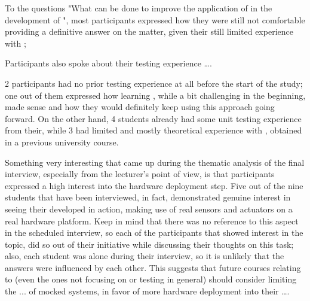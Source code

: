 To the questions "What can be done to improve the application of \tdd in the development of \ess", most participants expressed how they were still not comfortable providing a definitive answer on the matter, given their still limited experience with \tdd;

Participants also spoke about their testing experience \dots . 

2 participants had no prior testing experience at all before the start of the study; one out of them expressed how learning \tdd, while a bit challenging in the beginning, made sense and how they would definitely keep using this approach going forward. On the other hand, 4 students already had some unit testing experience from their, while 3 had limited and mostly theoretical experience with \tdd, obtained in a previous university course.

Something very interesting that came up during the thematic analysis of the final interview, especially from the lecturer's point of view, is that participants expressed a high interest into the hardware deployment step.
Five out of the nine students that have been interviewed, in fact, demonstrated genuine interest in seeing their developed \es in action, making use of real sensors and actuators on a real hardware platform. Keep in mind that there was no reference to this aspect in the scheduled interview, so each of the participants that showed interest in the topic, did so out of their initiative while discussing their thoughts on this task; also, each student was alone during their interview, so it is unlikely that the answers were influenced by each other.
This suggests that future courses relating to \ess (even the ones not focusing on \tdd or \ess testing in general) should consider limiting the ... of mocked systems, in favor of more hardware deployment into their \dots. 
